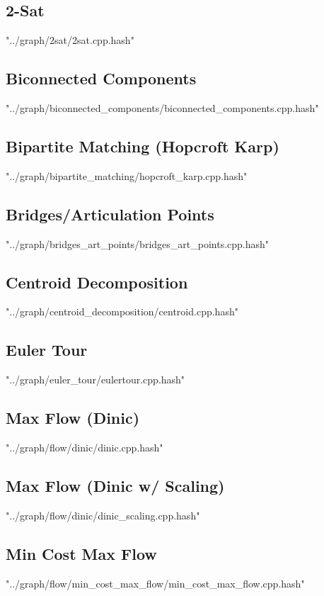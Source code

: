 \documentclass [5pt,twocolumn,oneside]{article}
\begin{document}
\begin{landscape}
\begin{multicols}{3}
\subsection{ 2-Sat}
 {"../graph/2sat/2sat.cpp.hash"}


\subsection{ Biconnected Components}
 {"../graph/biconnected_components/biconnected_components.cpp.hash"}


\subsection{ Bipartite Matching (Hopcroft Karp)}
 {"../graph/bipartite_matching/hopcroft_karp.cpp.hash"}


\subsection{ Bridges/Articulation Points}
 {"../graph/bridges_art_points/bridges_art_points.cpp.hash"}


\subsection{ Centroid Decomposition}
 {"../graph/centroid_decomposition/centroid.cpp.hash"}


\subsection{ Euler Tour}
 {"../graph/euler_tour/eulertour.cpp.hash"}


\subsection{ Max Flow (Dinic)}
 {"../graph/flow/dinic/dinic.cpp.hash"}


\subsection{ Max Flow (Dinic w/ Scaling)}
 {"../graph/flow/dinic/dinic_scaling.cpp.hash"}


\subsection{ Min Cost Max Flow}
 {"../graph/flow/min_cost_max_flow/min_cost_max_flow.cpp.hash"}



\end{multicols}
\end{landscape}
\end{document}

